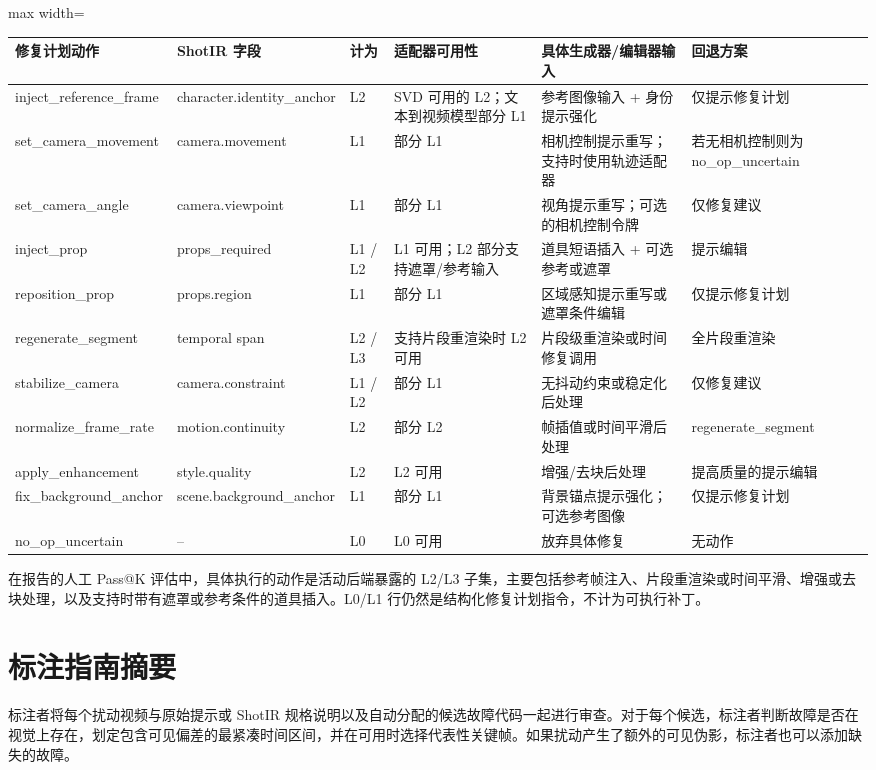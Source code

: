 \documentclass{article}
\begin{document}
\begin{table}[t]
\label{tab:patch_adapter_details}
\begin{adjustbox}{max width=\textwidth}
\begin{tabular}{p{}p{}p{}p{}p{}p{}}
\toprule
修复计划动作 & ShotIR 字段 & 计为 & 适配器可用性 & 具体生成器/编辑器输入 & 回退方案 \\
\midrule
inject\_reference\_frame & character.identity\_anchor & L2 & SVD 可用的 L2；文本到视频模型部分 L1 & 参考图像输入 + 身份提示强化 & 仅提示修复计划 \\
set\_camera\_movement & camera.movement & L1 & 部分 L1 & 相机控制提示重写；支持时使用轨迹适配器 & 若无相机控制则为 no\_op\_uncertain \\
set\_camera\_angle & camera.viewpoint & L1 & 部分 L1 & 视角提示重写；可选的相机控制令牌 & 仅修复建议 \\
inject\_prop & props\_required & L1 / L2 & L1 可用；L2 部分支持遮罩/参考输入 & 道具短语插入 + 可选参考或遮罩 & 提示编辑 \\
reposition\_prop & props.region & L1 & 部分 L1 & 区域感知提示重写或遮罩条件编辑 & 仅提示修复计划 \\
regenerate\_segment & temporal span & L2 / L3 & 支持片段重渲染时 L2 可用 & 片段级重渲染或时间修复调用 & 全片段重渲染 \\
stabilize\_camera & camera.constraint & L1 / L2 & 部分 L1 & 无抖动约束或稳定化后处理 & 仅修复建议 \\
normalize\_frame\_rate & motion.continuity & L2 & 部分 L2 & 帧插值或时间平滑后处理 & regenerate\_segment \\
apply\_enhancement & style.quality & L2 & L2 可用 & 增强/去块后处理 & 提高质量的提示编辑 \\
fix\_background\_anchor & scene.background\_anchor & L1 & 部分 L1 & 背景锚点提示强化；可选参考图像 & 仅提示修复计划 \\
no\_op\_uncertain & -- & L0 & L0 可用 & 放弃具体修复 & 无动作 \\
\bottomrule
\end{tabular}
\end{adjustbox}
\end{table}

在报告的人工 Pass@K 评估中，具体执行的动作是活动后端暴露的 L2/L3 子集，主要包括参考帧注入、片段重渲染或时间平滑、增强或去块处理，以及支持时带有遮罩或参考条件的道具插入。L0/L1 行仍然是结构化修复计划指令，不计为可执行补丁。

\section{标注指南摘要}
\label{app:annotation}
标注者将每个扰动视频与原始提示或 ShotIR 规格说明以及自动分配的候选故障代码一起进行审查。对于每个候选，标注者判断故障是否在视觉上存在，划定包含可见偏差的最紧凑时间区间，并在可用时选择代表性关键帧。如果扰动产生了额外的可见伪影，标注者也可以添加缺失的故障。
\end{document}

